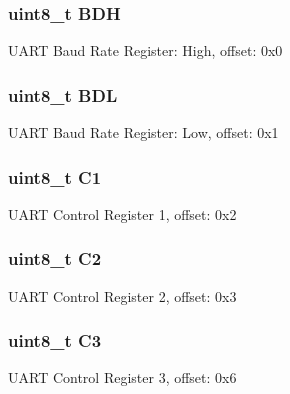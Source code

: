 \subsubsection[{B\+D\+H}]{\setlength{\rightskip}{0pt plus 5cm}uint8\+\_\+t B\+D\+H}\label{struct_u_a_r_t___mem_map_a98dc87068e86db23707f3f5d6192108c}
U\+A\+R\+T Baud Rate Register\+: High, offset\+: 0x0 \hypertarget{struct_u_a_r_t___mem_map_ae31ec5a78a5d91e855af347b60fee8b8}{}
\subsubsection[{B\+D\+L}]{\setlength{\rightskip}{0pt plus 5cm}uint8\+\_\+t B\+D\+L}\label{struct_u_a_r_t___mem_map_ae31ec5a78a5d91e855af347b60fee8b8}
U\+A\+R\+T Baud Rate Register\+: Low, offset\+: 0x1 \hypertarget{struct_u_a_r_t___mem_map_a8286c9d870f31a089d95e6a2285fbe2f}{}
\subsubsection[{C1}]{\setlength{\rightskip}{0pt plus 5cm}uint8\+\_\+t C1}\label{struct_u_a_r_t___mem_map_a8286c9d870f31a089d95e6a2285fbe2f}
U\+A\+R\+T Control Register 1, offset\+: 0x2 \hypertarget{struct_u_a_r_t___mem_map_acdf8ac8ab339152eaed13f4eca300aa5}{}
\subsubsection[{C2}]{\setlength{\rightskip}{0pt plus 5cm}uint8\+\_\+t C2}\label{struct_u_a_r_t___mem_map_acdf8ac8ab339152eaed13f4eca300aa5}
U\+A\+R\+T Control Register 2, offset\+: 0x3 \hypertarget{struct_u_a_r_t___mem_map_a328e95cb4deb2dd724cb8b26a5ab381b}{}
\subsubsection[{C3}]{\setlength{\rightskip}{0pt plus 5cm}uint8\+\_\+t C3}\label{struct_u_a_r_t___mem_map_a328e95cb4deb2dd724cb8b26a5ab381b}
U\+A\+R\+T Control Register 3, offset\+: 0x6 \hypertarget{struct_u_a_r_t___mem_map_a9ecb3242c606bc219190b4cb4f64600f}{}
